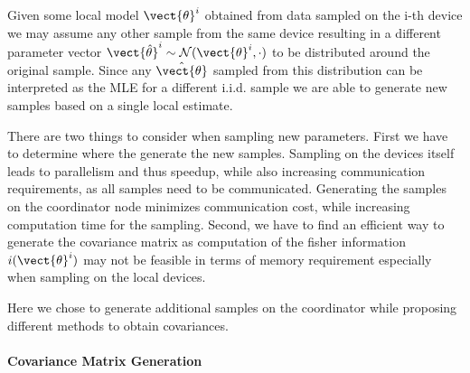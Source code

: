 Given some local model $\vect{\theta}^i$ obtained from data sampled on the i-th device we may assume any other sample from the same device resulting in a different parameter vector $\vect{\hat{\theta}}^i \sim \mathcal{N}(\vect{\theta}^i, \cdot)$ to be distributed around the original sample. 
Since any $\hat{\vect{\theta}}$ sampled from this distribution can be interpreted as the MLE for a different i.i.d. sample we are able to generate new samples based on a single local estimate.

There are two things to consider when sampling new parameters.
First we have to determine where the generate the new samples.
Sampling on the devices itself leads to parallelism and thus speedup, while also increasing communication requirements, as all samples need to be communicated.
Generating the samples on the coordinator node minimizes communication cost, while increasing computation time for the sampling. 
Second, we have to find an efficient way to generate the covariance matrix as computation of the fisher information $i(\vect{\theta}^i)$ may not be feasible in terms of memory requirement especially when sampling on the local devices.

Here we chose to generate additional samples on the coordinator while proposing different methods to obtain covariances.

\paragraph*{Covariance Matrix Generation}


